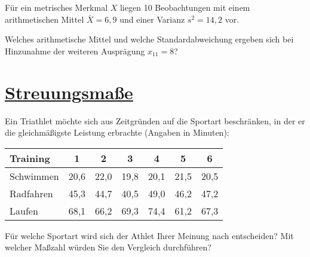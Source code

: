 \documentclass[12pt,a4paper]{article}
\newcommand{\tmpsection}[1]{}
\let\tmpsection=\section
\renewcommand{\section}[1]{\tmpsection{\underline{#1}} }
\begin{document}
Für ein metrisches Merkmal \(X\) liegen 10 Beobachtungen mit einem
arithmetischen Mittel \(\bar{X} = 6,9\) und einer Varianz \(s^2 = 14,2\)
vor.

Welches arithmetische Mittel und welche Standardabweichung ergeben sich
bei Hinzunahme der weiteren Ausprägung \(x_{11} = 8\)?

\hypertarget{streuungsmauxdfe-1}{%
\section{Streuungsmaße}\label{streuungsmauxdfe-1}}

Ein Triathlet möchte sich aus Zeitgründen auf die Sportart beschränken,
in der er die gleichmäßigste Leistung erbrachte (Angaben in Minuten):

\begin{center}
 \begin{tabular}{lcccccc} 
    Training   & 1     &    2  &   3   &    4  &    5  &   6   \\
    \toprule
    Schwimmen  & 20,6  &  22,0 &  19,8 &  20,1 &  21,5 &  20,5 \\ 
    Radfahren  & 45,3  &  44,7 &  40,5 &  49,0 &  46,2 &  47,2 \\ 
    Laufen     & 68,1  &  66,2 &  69,3 &  74,4 &  61,2 &  67,3 \\ 
\end{tabular}
\end{center}

Für welche Sportart wird sich der Athlet Ihrer Meinung nach entscheiden?
Mit welcher Maßzahl würden Sie den Vergleich durchführen?
\end{document}
